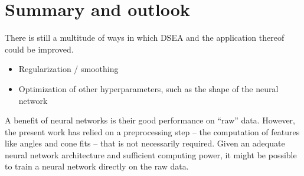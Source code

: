 \chapter{Summary and outlook}

There is still a multitude of ways in which DSEA and the application thereof could be improved.
\begin{itemize}
  \item Regularization / smoothing
  \item Optimization of other hyperparameters, such as the shape of the neural network
\end{itemize}

A benefit of neural networks is their good performance on \enquote{raw} data.
However,
the present work has relied on a preprocessing step %
  – the computation of features like angles and cone fits –
that is not necessarily required.
Given an adequate neural network architecture and sufficient computing power,
it might be possible to train a neural network directly on the raw data.


\blindtext[3]
